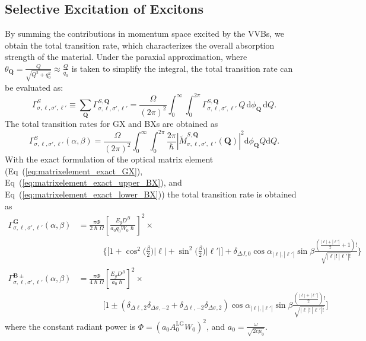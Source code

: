 \subsection{Selective Excitation of Excitons}

By summing the contributions in momentum space excited by the VVBs, we obtain the total transition rate, which characterizes the overall absorption strength of the material. Under the paraxial approximation, where $\theta_{\boldsymbol{Q}} = \frac{Q}{\sqrt{Q^2+q_0^2}} \approx \frac{Q}{q_0}$ is taken to simplify the integral, the total transition rate can be evaluated as:
\[
\Gamma^{S}_{\sigma, \ell, \sigma', \ell'} 
\equiv 
\sum_{\boldsymbol{Q}} 
\Gamma^{S, \boldsymbol{Q}}_{\sigma, \ell, \sigma', \ell'} 
=
\frac{\Omega}{(2\pi)^2} 
\int_0^\infty \int_0^{2\pi} 
\Gamma^{S, \boldsymbol{Q}}_{\sigma, \ell, \sigma', \ell'} 
\, Q \, \mathrm{d}\phi_{\boldsymbol{Q}} \, \mathrm{d}Q.
\]
The total transition rates for GX and BXs are obtained as
\begingroup
\color{red} %
\begin{equation}
\Gamma_{\sigma,\ell,\sigma',\ell'}^S(\alpha, \beta) 
= \frac{\Omega}{(2\pi)^2} \int_0^\infty \int_0^{2\pi} \frac{2\pi}{\hslash} \left| \widetilde{M}_{\sigma,\ell,\sigma',\ell'}^{S,\boldsymbol{Q}}(\boldsymbol{Q}) \right|^2 \mathrm{d}\phi_{\boldsymbol{Q}} Q \mathrm{d}Q.
\end{equation}
\noindent
With the exact formulation of the optical matrix element (Eq~(\ref{eq:matrixelement_exact_GX}), Eq~(\ref{eq:matrixelement_exact_upper_BX}), and Eq~(\ref{eq:matrixelement_exact_lower_BX})) the total transition rate is obtained as
\begin{align}
\Gamma_{\sigma,\ell,\sigma',\ell'}^{\boldsymbol{G}}(\alpha, \beta) 
&= \frac{\pi \Phi}{2\hslash \Omega} \left[ \frac{E_g D^B}{a_0 q_0 W_0 \hslash} \right]^2 \times \nonumber \\
&\quad\quad\quad \Big\{ \Big[ 1 + \cos^2\big(\tfrac{\beta}{2}\big) |\ell| + \sin^2\big(\tfrac{\beta}{2}\big) |\ell'| \Big] + \delta_{\Delta J, 0} \cos\alpha_{|\ell|,|\ell'|} \sin\beta \frac{(\tfrac{|\ell|+|\ell'|}{2} + 1)!}{\sqrt{|\ell|! \, |\ell'|!}} \Big\} 
\label{eq:gamma_G} \\[8pt]
\Gamma_{\sigma,\ell,\sigma',\ell'}^{\boldsymbol{B}\pm}(\alpha, \beta) 
&= \frac{\pi \Phi}{4\hslash \Omega} \left[ \frac{E_g D^B}{a_0 \hslash} \right]^2 \times \nonumber \\
&\quad\quad\quad \Big[ 1 \pm (\delta_{\Delta\ell, 2} \delta_{\Delta\sigma, -2} + \delta_{\Delta\ell, -2} \delta_{\Delta\sigma, 2}) \cos\alpha_{|\ell|,|\ell'|} \sin\beta \frac{(\tfrac{|\ell|+|\ell'|}{2})!}{\sqrt{|\ell|! \, |\ell'|!}} \Big]
\label{eq:gamma_B_pm}
\end{align}
where the constant radiant power is $\Phi = (a_0 A_0^{\mathrm{LG}} W_0)^2$, and $a_0 = \frac{\omega}{\sqrt{2c\mu_0}}$. 

